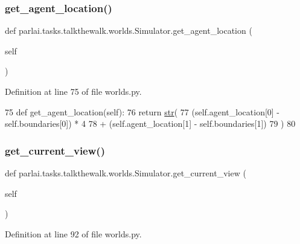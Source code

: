 \subsubsection{\texorpdfstring{get\+\_\+agent\+\_\+location()}{get\_agent\_location()}}
{\footnotesize\ttfamily def parlai.\+tasks.\+talkthewalk.\+worlds.\+Simulator.\+get\+\_\+agent\+\_\+location (\begin{DoxyParamCaption}\item[{}]{self }\end{DoxyParamCaption})}



Definition at line 75 of file worlds.\+py.


\begin{DoxyCode}
75     \textcolor{keyword}{def }get\_agent\_location(self):
76         \textcolor{keywordflow}{return} \hyperlink{namespacegenerate__task__READMEs_a5b88452ffb87b78c8c85ececebafc09f}{str}(
77             (self.agent\_location[0] - self.boundaries[0]) * 4
78             + (self.agent\_location[1] - self.boundaries[1])
79         )
80 
\end{DoxyCode}
\mbox{\label{classparlai_1_1tasks_1_1talkthewalk_1_1worlds_1_1Simulator_a5178f95389423f1ee1ad5440e60ad976}} 
\subsubsection{\texorpdfstring{get\+\_\+current\+\_\+view()}{get\_current\_view()}}
{\footnotesize\ttfamily def parlai.\+tasks.\+talkthewalk.\+worlds.\+Simulator.\+get\+\_\+current\+\_\+view (\begin{DoxyParamCaption}\item[{}]{self }\end{DoxyParamCaption})}



Definition at line 92 of file worlds.\+py.


